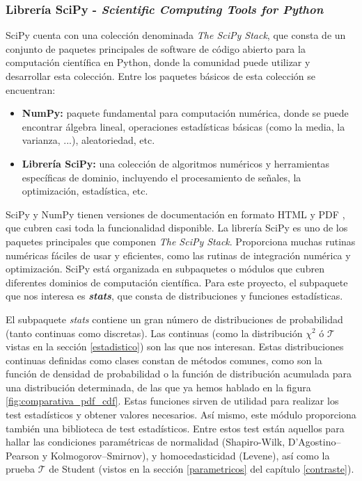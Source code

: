 \subsubsection{\textbf{Librería SciPy - \textit{Scientific Computing Tools for Python}}}
SciPy \cite{scipy} cuenta con una colección denominada \textit{The SciPy Stack}, que consta de un conjunto de paquetes principales de software de código abierto para la computación científica en Python, donde la comunidad puede utilizar y desarrollar esta colección. Entre los paquetes básicos de esta colección se encuentran:
\begin{itemize}
\item \textbf{NumPy:} paquete fundamental para computación numérica, donde se puede encontrar álgebra lineal, operaciones estadísticas básicas (como la media, la varianza, ...), aleatoriedad, etc. 
\item \textbf{Librería SciPy:} una colección de algoritmos numéricos y herramientas específicas de dominio, incluyendo el procesamiento de señales, la optimización, estadística, etc.
\end{itemize}
SciPy y NumPy tienen versiones de documentación en formato HTML y PDF \cite{scipy-doc}, que cubren casi toda la funcionalidad disponible.
La librería SciPy es uno de los paquetes principales que componen \textit{The SciPy Stack}. Proporciona muchas rutinas numéricas fáciles de usar y eficientes, como las rutinas de integración numérica y optimización. SciPy está organizada en subpaquetes o módulos que cubren diferentes dominios de computación científica. Para este proyecto, el subpaquete que nos interesa es \textit{\textbf{stats}}, que consta de distribuciones y funciones estadísticas.

El subpaquete \textit{stats} contiene un gran número de distribuciones de probabilidad (tanto continuas como discretas). Las continuas (como la distribución $\chi^2$ ó $\mathcal{T}$ vistas en la sección \ref{estadistico}) son las que nos interesan. Estas distribuciones continuas definidas como clases constan de métodos comunes, como son la función de densidad de probabilidad o la función de distribución acumulada para una distribución determinada, de las que ya hemos hablado en la figura \ref{fig:comparativa_pdf_cdf}. Estas funciones sirven de utilidad para realizar los test estadísticos y obtener valores necesarios. Así mismo, este módulo proporciona también una biblioteca de test estadísticos. Entre estos test están aquellos para hallar las condiciones paramétricas de normalidad (Shapiro-Wilk, D’Agostino–Pearson y Kolmogorov–Smirnov), y homocedasticidad (Levene), así como la prueba $\mathcal{T}$ de Student (vistos en la sección \ref{parametricos} del capítulo \ref{contraste}). 

